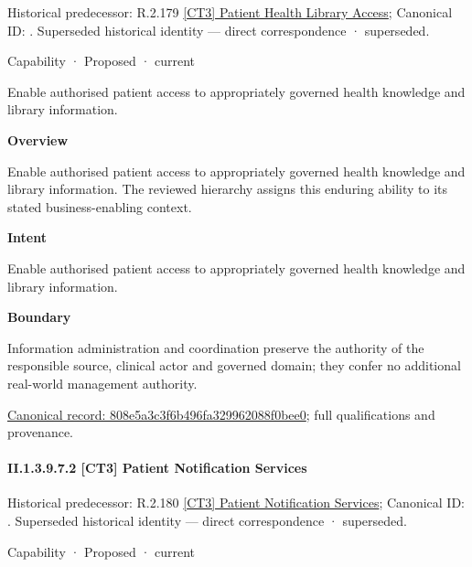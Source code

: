 {\small Historical predecessor: R.2.179 \hyperref[element:b132224cfa6f435f8f2a66a3878d6df6]{[CT3] Patient Health Library Access}; Canonical ID: \texttt{}. Superseded historical identity — direct correspondence · superseded.}\par
\label{element:808e5a3c3f6b496fa329962088f0bee0}
{\small Capability · Proposed · current}\par

Enable authorised patient access to appropriately governed health knowledge and library information.



\textbf{Overview}



Enable authorised patient access to appropriately governed health knowledge and library information. The reviewed hierarchy assigns this enduring ability to its stated business-enabling context.



\textbf{Intent}



Enable authorised patient access to appropriately governed health knowledge and library information.



\textbf{Boundary}



Information administration and coordination preserve the authority of the responsible source, clinical actor and governed domain; they confer no additional real-world management authority.


{\footnotesize \href{../../../../../../../continuum/strategy/capability/808e5a3c3f6b496fa329962088f0bee0.md}{Canonical record: 808e5a3c3f6b496fa329962088f0bee0}; full qualifications and provenance.}\par
\paragraph*{II.1.3.9.7.2 [CT3] Patient Notification Services}
\label{navigation:II.1.3.9.7.2}

{\small Historical predecessor: R.2.180 \hyperref[element:35c5be472bf2433fbbde9646d87aefb3]{[CT3] Patient Notification Services}; Canonical ID: \texttt{}. Superseded historical identity — direct correspondence · superseded.}\par
\label{element:9d172cd511b742499c4e7c23f6630a35}
{\small Capability · Proposed · current}\par

